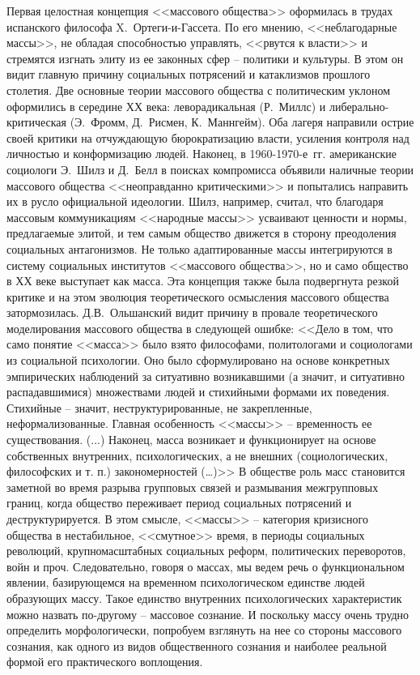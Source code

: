 Первая целостная концепция <<массового общества>> оформилась в трудах испанского философа X.~Ортеги-и-Гассета\autocite{ortera_i_gasset_mass}.
По его мнению, <<неблагодарные массы>>, не обладая способностью управлять, <<рвутся к власти>>
и стремятся изгнать элиту из ее законных сфер -- политики и культуры. В этом он видит главную причину
социальных потрясений и катаклизмов прошлого столетия. Две основные теории массового общества
с политическим уклоном оформились в середине ХХ века: леворадикальная (Р.~Миллс)
и либерально-критическая (Э.~Фромм, Д.~Рисмен, К.~Маннгейм). Оба лагеря направили острие своей критики
на отчуждающую бюрократизацию власти, усиления контроля над личностью и конформизацию людей.
Наконец, в 1960-1970-е~гг. американские социологи Э.~Шилз и Д.~Белл в поисках компромисса объявили
наличные теории массового общества <<неоправданно критическими>> и попытались направить их в русло
официальной идеологии. Шилз, например, считал, что благодаря массовым коммуникациям <<народные массы>>
усваивают ценности и нормы, предлагаемые элитой, и тем самым общество движется в сторону
преодоления социальных антагонизмов. Не только адаптированные массы интегрируются в систему
социальных институтов <<массового общества>>, но и само общество в ХХ веке выступает как масса.
Эта концепция также была подвергнута резкой критике и на этом эволюция теоретического осмысления массового
общества затормозилась. Д.В.~Ольшанский видит причину в провале теоретического моделирования
массового общества в следующей ошибке: <<Дело в том, что само понятие <<масса>> было взято философами,
политологами и социологами из социальной психологии. Оно было сформулировано на основе
конкретных эмпирических наблюдений за ситуативно возникавшими (а значит, и ситуативно распадавшимися)
множествами людей и стихийными формами их поведения. Стихийные -- значит, неструктурированные, не
закрепленные, неформализованные. Главная особенность <<массы>> -- временность ее существования. ($\ldots$)
Наконец, масса возникает и функционирует на основе собственных внутренних, психологических,
а не внешних (социологических, философских и т. п.) закономерностей (\ldots)>>\autocite{book:olshansky}
В обществе роль масс становится заметной во время разрыва групповых связей и размывания
межгрупповых границ, когда общество переживает период социальных потрясений и деструктурируется.
В этом смысле, <<массы>> -- категория кризисного общества в нестабильное, <<смутное>> время, в периоды
социальных революций, крупномасштабных социальных реформ,
политических переворотов, войн и проч. Следовательно, говоря о массах, мы ведем речь о функциональном явлении,
базирующемся на временном психологическом единстве людей образующих массу. Такое единство внутренних психологических
характеристик можно назвать по-другому -- массовое сознание. И поскольку массу очень трудно определить морфологически,
попробуем взглянуть на нее со стороны массового сознания, как одного из видов общественного сознания и
наиболее реальной формой его практического воплощения.

